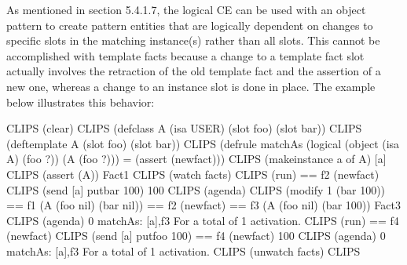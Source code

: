 \documentclass[letterpaper,10pt,english]{sphinxmanual}
\begin{document}
\begin{sphinxVerbatim}[commandchars=\\\{\}]
  
          
       
  
        
        
  
\end{sphinxVerbatim}

As mentioned in section 5.4.1.7, the logical CE can be used with an
object pattern to create pattern entities that are logically dependent
on changes to specific slots in the matching instance(s) rather than all
slots. This cannot be accomplished with template facts because a change
to a template fact slot actually involves the retraction of the old
template fact and the assertion of a new one, whereas a change to an
instance slot is done in place. The example below illustrates this
behavior:

\begin{sphinxVerbatim}[commandchars=\\\{\}]
CLIPS\PYGZgt{} (clear)
CLIPS\PYGZgt{}
(defclass A (is\PYGZhy{}a USER)
  (slot foo)
  (slot bar))
CLIPS\PYGZgt{}
(deftemplate A
  (slot foo)
  (slot bar))
CLIPS\PYGZgt{}
(defrule match\PYGZhy{}A\PYGZhy{}s
  (logical (object (is\PYGZhy{}a A) (foo ?))
  (A (foo ?)))
  =\PYGZgt{}
  (assert (new\PYGZhy{}fact)))
CLIPS\PYGZgt{} (make\PYGZhy{}instance a of A)
[a]
CLIPS\PYGZgt{} (assert (A))
\PYGZlt{}Fact\PYGZhy{}1\PYGZgt{}
CLIPS\PYGZgt{} (watch facts)
CLIPS\PYGZgt{} (run)
==\PYGZgt{} f\PYGZhy{}2 (new\PYGZhy{}fact)
CLIPS\PYGZgt{} (send [a] put\PYGZhy{}bar 100)
100
CLIPS\PYGZgt{} (agenda)
CLIPS\PYGZgt{} (modify 1 (bar 100))
\PYGZlt{}== f\PYGZhy{}1 (A (foo nil) (bar nil))
\PYGZlt{}== f\PYGZhy{}2 (new\PYGZhy{}fact)
==\PYGZgt{} f\PYGZhy{}3 (A (foo nil) (bar 100))
\PYGZlt{}Fact\PYGZhy{}3\PYGZgt{}
CLIPS\PYGZgt{} (agenda)
0 match\PYGZhy{}A\PYGZhy{}s: [a],f\PYGZhy{}3
For a total of 1 activation.
CLIPS\PYGZgt{} (run)
==\PYGZgt{} f\PYGZhy{}4 (new\PYGZhy{}fact)
CLIPS\PYGZgt{} (send [a] put\PYGZhy{}foo 100)
\PYGZlt{}== f\PYGZhy{}4 (new\PYGZhy{}fact)
100
CLIPS\PYGZgt{} (agenda)
0 match\PYGZhy{}A\PYGZhy{}s: [a],f\PYGZhy{}3
For a total of 1 activation.
CLIPS\PYGZgt{} (unwatch facts)
CLIPS\PYGZgt{}
\end{sphinxVerbatim}
\end{document}
